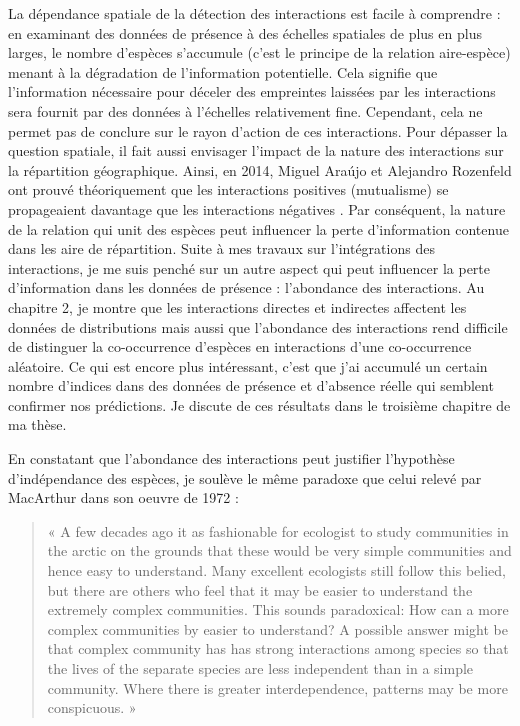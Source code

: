 La dépendance spatiale de la détection des interactions est facile à
comprendre : en examinant des données de présence à des échelles
spatiales de plus en plus larges, le nombre d'espèces s'accumule (c'est
le principe de la relation aire-espèce) menant à la dégradation de
l'information potentielle. Cela signifie que l'information nécessaire
pour déceler des empreintes laissées par les interactions sera fournit
par des données à l'échelles relativement fine. Cependant, cela ne
permet pas de conclure sur le rayon d'action de ces interactions. Pour
dépasser la question spatiale, il fait aussi envisager l'impact de la
nature des interactions sur la répartition géographique. Ainsi, en 2014,
Miguel Araújo et Alejandro Rozenfeld ont prouvé théoriquement que les
interactions positives (mutualisme) se propageaient davantage que les
interactions négatives \citep{Araujo2014}. Par conséquent, la nature de
la relation qui unit des espèces peut influencer la perte d'information
contenue dans les aire de répartition. Suite à mes travaux sur
l'intégrations des interactions, je me suis penché sur un autre aspect
qui peut influencer la perte d'information dans les données de présence
: l'abondance des interactions. Au chapitre 2, je montre que les
interactions directes et indirectes affectent les données de
distributions mais aussi que l'abondance des interactions rend difficile
de distinguer la co-occurrence d'espèces en interactions d'une
co-occurrence aléatoire. Ce qui est encore plus intéressant, c'est que
j'ai accumulé un certain nombre d'indices dans des données de présence
et d'absence réelle qui semblent confirmer nos prédictions. Je discute
de ces résultats dans le troisième chapitre de ma thèse.

En constatant que l'abondance des interactions peut justifier
l'hypothèse d'indépendance des espèces, je soulève le même paradoxe que
celui relevé par MacArthur dans son oeuvre de 1972
\citep{macarthur1972geographical} :

\begin{quote}
« A few decades ago it as fashionable for ecologist to study communities
in the arctic on the grounds that these would be very simple communities
and hence easy to understand. Many excellent ecologists still follow
this belied, but there are others who feel that it may be easier to
understand the extremely complex communities. This sounds paradoxical:
How can a more complex communities by easier to understand? A possible
answer might be that complex community has has strong interactions among
species so that the lives of the separate species are less independent
than in a simple community. Where there is greater interdependence,
patterns may be more conspicuous. »
\end{quote}

